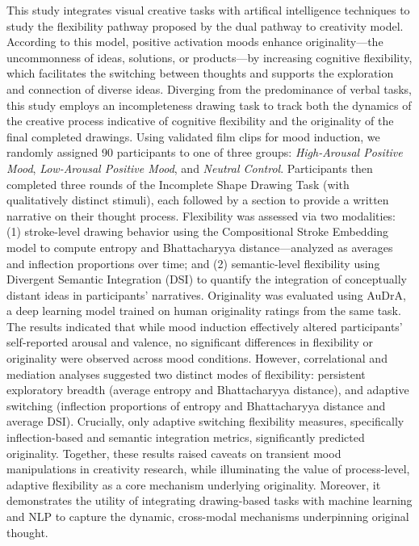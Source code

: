 \documentclass[../MA_Thesis.tex]{subfiles}
\begin{document}
This study integrates visual creative tasks with artifical intelligence techniques to study the flexibility pathway proposed by the dual pathway to creativity model. According to this model, positive activation moods enhance originality—the uncommonness of ideas, solutions, or products—by increasing cognitive flexibility, which facilitates the switching between thoughts and supports the exploration and connection of diverse ideas. Diverging from the predominance of verbal tasks, this study employs an incompleteness drawing task to track both the dynamics of the creative process indicative of cognitive flexibility and the originality of the final completed drawings. Using validated film clips for mood induction, we randomly assigned 90 participants to one of three groups: \textit{High-Arousal Positive Mood}, \textit{Low-Arousal Positive Mood}, and \textit{Neutral Control}. Participants then completed three rounds of the Incomplete Shape Drawing Task (with qualitatively distinct stimuli), each followed by a section to provide a written narrative on their thought process. Flexibility was assessed via two modalities: (1) stroke-level drawing behavior using the Compositional Stroke Embedding model to compute entropy and Bhattacharyya distance—analyzed as averages and inflection proportions over time; and (2) semantic-level flexibility using Divergent Semantic Integration (DSI) to quantify the integration of conceptually distant ideas in participants’ narratives. Originality was evaluated using AuDrA, a deep learning model trained on human originality ratings from the same task. The results indicated that while mood induction effectively altered participants’ self-reported arousal and valence, no significant differences in flexibility or originality were observed across mood conditions. However, correlational and mediation analyses suggested two distinct modes of flexibility: persistent exploratory breadth (average entropy and Bhattacharyya distance), and adaptive switching (inflection proportions of entropy and Bhattacharyya distance and average DSI). Crucially, only adaptive switching flexibility measures, specifically inflection-based and semantic integration metrics, significantly predicted originality. Together, these results raised caveats on transient mood manipulations in creativity research, while illuminating the value of process-level, adaptive flexibility as a core mechanism underlying originality. Moreover, it demonstrates the utility of integrating drawing-based tasks with machine learning and NLP to capture the dynamic, cross-modal mechanisms underpinning original thought.
\end{document}
